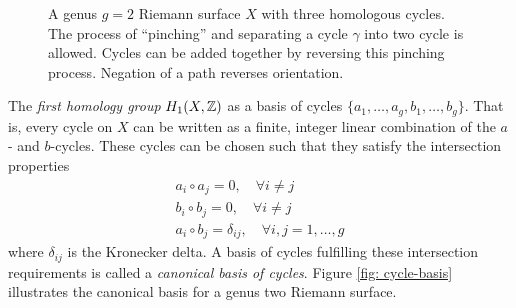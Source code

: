 \begin{figure}
  \caption{A genus $g=2$ Riemann surface $X$ with three homologous
    cycles. The process of ``pinching'' and separating a cycle $\gamma$
    into two cycle is allowed. Cycles can be added together by reversing
    this pinching process. Negation of a path reverses orientation.}
  \label{fig: pinching}
\end{figure}

The {\it first homology group} $H_1(X,\operatorname{\mathbb{Z}})$ as a basis of cycles
$\{a_1,\ldots,a_g,b_1,\ldots,b_g\}$. That is, every cycle on $X$ can be
written as a finite, integer linear combination of the $a$- and
$b$-cycles. These cycles can be chosen such that they satisfy the
intersection properties
\begin{gather*}
  a_i \circ a_j = 0, \quad \forall i \neq j \\
  b_i \circ b_j = 0, \quad \forall i \neq j \\
  a_i \circ b_j = \delta_{ij}, \quad \forall i,j = 1, \ldots, g
\end{gather*}
where $\delta_{ij}$ is the Kronecker delta. A basis of cycles fulfilling
these intersection requirements is called a {\it canonical basis of
  cycles}. Figure \ref{fig: cycle-basis} illustrates the canonical basis
for a genus two Riemann surface.

